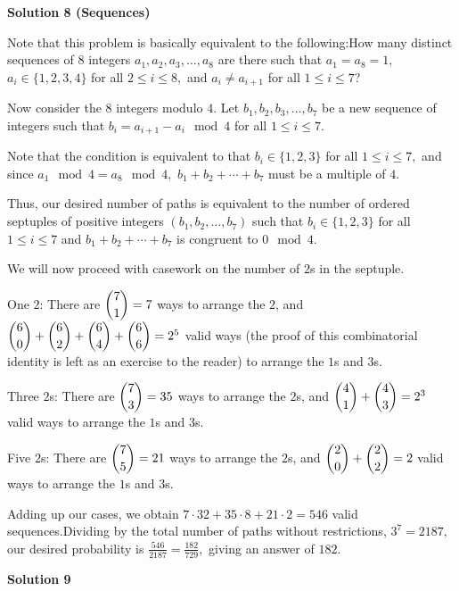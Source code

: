 \begin{enumerate}
\textbf{Solution 8 (Sequences)}

Note that this problem is basically equivalent to the following:How many distinct sequences of $8$ integers $a_1, a_2, a_3, \ldots, a_8$ are there such that $a_1 = a_8 = 1,$ $a_i \in \{1, 2, 3, 4\}$ for all $2 \leq i\leq 8,$ and $a_i \neq a_{i+1}$ for all $1 \leq i \leq 7$? 

 Now consider the $8$ integers modulo $4.$ Let $b_1, b_2, b_3, \ldots, b_7$ be a new sequence of integers such that $b_i = a_{i+1} - a_i \mod 4$ for all $1 \leq i \leq 7.$

 Note that the condition is equivalent to that $b_i \in \{1, 2, 3\}$ for all $1 \leq i \leq 7,$ and since $a_1 \mod 4 = a_8 \mod 4,$ $b_1 + b_2 + \cdots + b_7$ must be a multiple of $4.$

 Thus, our desired number of paths is equivalent to the number of ordered septuples of positive integers $(b_1, b_2, \ldots, b_7)$ such that $b_i \in \{1, 2, 3\}$ for all $1 \leq i \leq 7$ and $b_1 + b_2 + \cdots + b_7$ is congruent to $0 \mod 4.$

 We will now proceed with casework on the number of $2$s in the septuple.

 One $2$: There are $\dbinom{7}{1} = 7$ ways to arrange the $2$, and $\dbinom{6}{0} + \dbinom{6}{2} + \dbinom{6}{4} + \dbinom{6}{6} = 2^5$ valid ways (the proof of this combinatorial identity is left as an exercise to the reader) to arrange the $1$s and $3$s.

 Three $2$s: There are $\dbinom{7}{3} = 35$ ways to arrange the $2$s, and $\dbinom{4}{1} + \dbinom{4}{3} = 2^3$ valid ways to arrange the $1$s and $3$s.

 Five $2$s: There are $\dbinom{7}{5} = 21$ ways to arrange the $2$s, and $\dbinom{2}{0} + \dbinom{2}{2} = 2$ valid ways to arrange the $1$s and $3$s.

 Adding up our cases, we obtain $7 \cdot 32 + 35 \cdot 8 + 21 \cdot 2 = 546$ valid sequences.Dividing by the total number of paths without restrictions, $3^7 = 2187,$ our desired probability is $\frac{546}{2187} = \frac{182}{729},$ giving an answer of $\boxed{182}.$




\textbf{Solution 9}


\end{enumerate}
